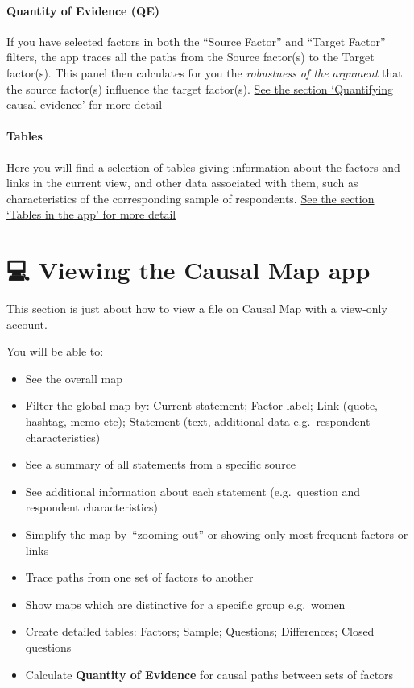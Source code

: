\documentclass[
]{book}
\providecommand{\tightlist}{%
  \setlength{\itemsep}{0pt}\setlength{\parskip}{0pt}}
\begin{document}
\hypertarget{quantity-of-evidence-qe}{%
\subsubsection{Quantity of Evidence (QE)}\label{quantity-of-evidence-qe}}

If you have selected factors in both the ``Source Factor'' and ``Target Factor'' filters, the app traces all the paths from the Source factor(s) to the Target factor(s). This panel then calculates for you the \emph{robustness of the argument} that the source factor(s) influence the target factor(s). \protect\hyperlink{quantifying-causal-evidence}{See the section `Quantifying causal evidence' for more detail}

\hypertarget{tables}{%
\subsubsection{Tables}\label{tables}}

Here you will find a selection of tables giving information about the factors and links in the current view, and other data associated with them, such as characteristics of the corresponding sample of respondents. \protect\hyperlink{tables-in-the-app}{See the section `Tables in the app' for more detail}

\hypertarget{viewing}{%
\chapter{💻 Viewing the Causal Map app}\label{viewing}}

This section is just about how to view a file on Causal Map with a view-only account.

You will be able to:

\begin{itemize}
\tightlist
\item
  See the overall map
\item
  Filter the global map by: Current statement; Factor label; \protect\hyperlink{filtering-the-map-by-link-hashtag-memo}{Link (quote, hashtag, memo etc)}; \protect\hyperlink{filtering-the-map-by-statement-source-question}{Statement} (text, additional data e.g.~respondent characteristics)
\item
  See a summary of all statements from a specific source
\item
  See additional information about each statement (e.g.~question and respondent characteristics)
\item
  Simplify the map by~``zooming out'' or showing only most frequent factors or links
\item
  Trace paths from one set of factors to another
\item
  Show maps which are distinctive for a specific group e.g.~women
\item
  Create detailed tables: Factors; Sample; Questions; Differences; Closed questions
\item
  Calculate \textbf{Quantity of Evidence} for causal paths between sets of factors
\end{itemize}
\end{document}
